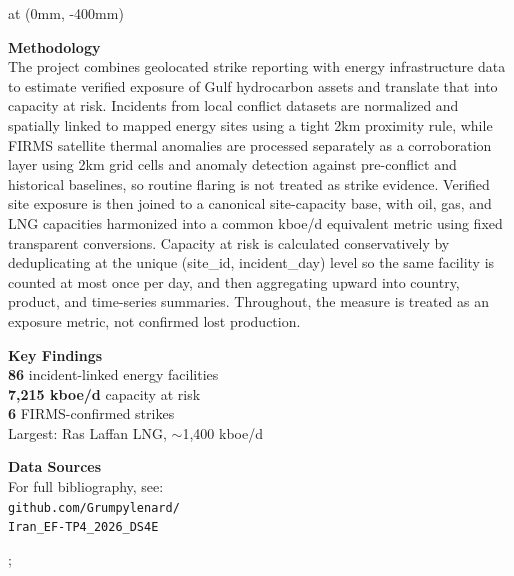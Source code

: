 \documentclass[a0paper,landscape,25pt]{tikzposter}
\begin{document}
  at (0mm, -400mm) {
  \begin{minipage}{1120mm}
    \begin{minipage}[t]{720mm}
      {\fontsize{22}{26}\selectfont\bfseries\color{darkblue} Methodology}\\[4mm]
      {\fontsize{16}{19}\selectfont
        The project combines geolocated strike reporting with energy infrastructure data to estimate verified exposure of Gulf hydrocarbon assets and translate that into capacity at risk. Incidents from local conflict datasets are normalized and spatially linked to mapped energy sites using a tight 2km proximity rule, while FIRMS satellite thermal anomalies are processed separately as a corroboration layer using 2km grid cells and anomaly detection against pre-conflict and historical baselines, so routine flaring is not treated as strike evidence. Verified site exposure is then joined to a canonical site-capacity base, with oil, gas, and LNG capacities harmonized into a common kboe/d equivalent metric using fixed transparent conversions. Capacity at risk is calculated conservatively by deduplicating at the unique (site\_id, incident\_day) level so the same facility is counted at most once per day, and then aggregating upward into country, product, and time-series summaries. Throughout, the measure is treated as an exposure metric, not confirmed lost production.
      }
    \end{minipage}%
    \hfill%
    \begin{minipage}[t]{190mm}
      {\fontsize{22}{26}\selectfont\bfseries\color{darkblue} Key Findings}\\[4mm]
      {\fontsize{17}{21}\selectfont
        \textbf{86} incident-linked energy facilities\\
        \textbf{7,215 kboe/d} capacity at risk\\
        \textbf{6} FIRMS-confirmed strikes\\
        Largest: Ras Laffan LNG, $\sim$1,400 kboe/d
      }
    \end{minipage}%
    \hfill%
    \begin{minipage}[t]{170mm}
      {\fontsize{22}{26}\selectfont\bfseries\color{darkblue} Data Sources}\\[4mm]
      {\fontsize{15}{19}\selectfont
        For full bibliography, see:\\[2mm]
        \texttt{github.com/Grumpylenard/}\\
        \texttt{Iran\_EF-TP4\_2026\_DS4E}
      }
    \end{minipage}
  \end{minipage}
};
\end{document}
